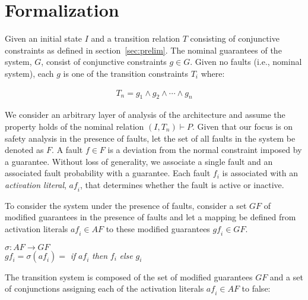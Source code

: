 \section{Formalization}
\label{sec:formalization}
Given an initial state $I$ and a transition relation $T$ consisting of conjunctive constraints as defined in section~\ref{sec:prelim}. The nominal guarantees of the system, $G$, consist of conjunctive constraints $g \in G$. Given no faults (i.e., nominal system), each $g$ is one of the transition constraints $T_i$ where:

\begin{gather}
T_n = g_1 \land  g_2 \land \cdots \land g_n
\label{eq:Tn}
\end{gather}

We consider an arbitrary layer of analysis of the architecture and assume the property holds of the nominal relation $(I,T_n) \vdash P$. Given that our focus is on safety analysis in the presence of faults, let the set of all faults in the system be  denoted as $F$. A fault $f \in F$ is a deviation from the normal constraint imposed by a guarantee. Without loss of generality, we associate a single fault and an associated fault probability with a guarantee. Each fault $f_i$ is associated with an \emph{activation literal}, $\mathit{af}_i$, that determines whether the fault is active or inactive. %


To consider the system under the presence of faults, consider a set $GF$ of modified guarantees in the presence of faults and let a mapping be defined from activation literals $\mathit{af}_i \in AF$ to these modified guarantees $\mathit{gf}_i \in GF$. 
\begin{center}
$\sigma : AF \rightarrow GF$ \\
$\mathit{gf}_i = \sigma(\mathit{af}_i) =$ \textit{if} $\mathit{af}_i$ \textit{then} $f_i$ \textit{else} $g_i$\\
\label{eq:sigma}
\end{center}

The transition system is composed of the set of modified guarantees $GF$ and a set of conjunctions assigning each of the activation literals $\mathit{af}_i \in AF$ to false: 

